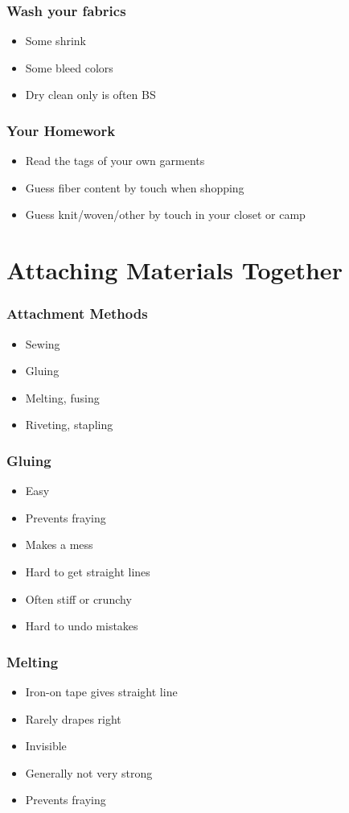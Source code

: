 \documentclass{beamer}
\begin{document}
\begin{frame}[fragile]
\frametitle{Wash your fabrics}
\begin{itemize}[<+(1)->]
\item Some shrink
\item Some bleed colors
\item Dry clean only is often BS
\end{itemize}
\end{frame}


\begin{frame}[fragile]
\frametitle{Your Homework}
\begin{itemize}[<+(1)->]
\item Read the tags of your own garments
\item Guess fiber content by touch when shopping
\item Guess knit/woven/other by touch in your closet or camp
\end{itemize}
\end{frame}

\section{Attaching Materials Together}

\begin{frame}[fragile]
\frametitle{Attachment Methods}
\begin{itemize}[<+(1)->]
\item Sewing
\item Gluing
\item Melting, fusing
\item Riveting, stapling
\end{itemize}
\end{frame}

\begin{frame}[fragile]
\frametitle{Gluing}
\begin{itemize}[<+(1)->]
\item Easy
\item Prevents fraying
\item Makes a mess
\item Hard to get straight lines
\item Often stiff or crunchy
\item Hard to undo mistakes
\end{itemize}
\end{frame}

\begin{frame}[fragile]
\frametitle{Melting}
\begin{itemize}[<+(1)->]
\item Iron-on tape gives straight line
\item Rarely drapes right
\item Invisible
\item Generally not very strong
\item Prevents fraying
\end{itemize}
\end{frame}
\end{document}
